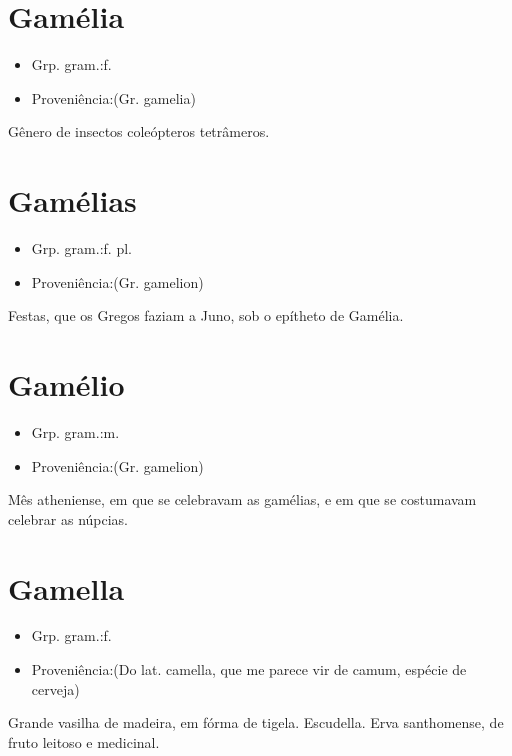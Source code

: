 \section{Gamélia}
\begin{itemize}
\item {Grp. gram.:f.}
\end{itemize}
\begin{itemize}
\item {Proveniência:(Gr. \textunderscore gamelia\textunderscore )}
\end{itemize}
Gênero de insectos coleópteros tetrâmeros.
\section{Gamélias}
\begin{itemize}
\item {Grp. gram.:f. pl.}
\end{itemize}
\begin{itemize}
\item {Proveniência:(Gr. \textunderscore gamelion\textunderscore )}
\end{itemize}
Festas, que os Gregos faziam a Juno, sob o epítheto de Gamélia.
\section{Gamélio}
\begin{itemize}
\item {Grp. gram.:m.}
\end{itemize}
\begin{itemize}
\item {Proveniência:(Gr. \textunderscore gamelion\textunderscore )}
\end{itemize}
Mês atheniense, em que se celebravam as gamélias, e em que se costumavam celebrar as núpcias.
\section{Gamella}
\begin{itemize}
\item {Grp. gram.:f.}
\end{itemize}
\begin{itemize}
\item {Proveniência:(Do lat. \textunderscore camella\textunderscore , que me parece vir de \textunderscore camum\textunderscore , espécie de cerveja)}
\end{itemize}
Grande vasilha de madeira, em fórma de tigela.
Escudella.
Erva santhomense, de fruto leitoso e medicinal.
